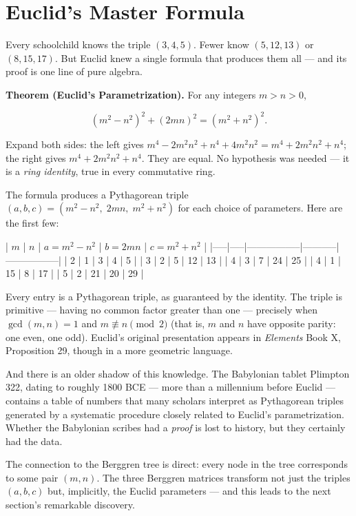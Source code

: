 \documentclass[11pt,twoside,openright]{book}
\theoremstyle{definition}
\theoremstyle{remark}
\begin{document}
\section{Euclid's Master Formula}

Every schoolchild knows the triple $(3, 4, 5)$. Fewer know $(5, 12, 13)$ or $(8, 15, 17)$. But Euclid knew a single formula that produces them all --- and its proof is one line of pure algebra.

\textbf{Theorem (Euclid's Parametrization).} For any integers $m > n > 0$,

\[(m^2 - n^2)^2 + (2mn)^2 = (m^2 + n^2)^2.\]

Expand both sides: the left gives $m^4 - 2m^2 n^2 + n^4 + 4m^2 n^2 = m^4 + 2m^2 n^2 + n^4$; the right gives $m^4 + 2m^2 n^2 + n^4$. They are equal. No hypothesis was needed --- it is a \textit{ring identity}, true in every commutative ring.

The formula produces a Pythagorean triple $(a, b, c) = (m^2 - n^2, \; 2mn, \; m^2 + n^2)$ for each choice of parameters. Here are the first few:

| $m$ | $n$ | $a = m^2 - n^2$ | $b = 2mn$ | $c = m^2 + n^2$ |
|-----|-----|-----------------|-----------|-----------------|
| 2   | 1   | 3               | 4         | 5               |
| 3   | 2   | 5               | 12        | 13              |
| 4   | 3   | 7               | 24        | 25              |
| 4   | 1   | 15              | 8         | 17              |
| 5   | 2   | 21              | 20        | 29              |

Every entry is a Pythagorean triple, as guaranteed by the identity. The triple is primitive --- having no common factor greater than one --- precisely when $\gcd(m, n) = 1$ and $m \not\equiv n \pmod{2}$ (that is, $m$ and $n$ have opposite parity: one even, one odd). Euclid's original presentation appears in \textit{Elements} Book X, Proposition 29, though in a more geometric language.

And there is an older shadow of this knowledge. The Babylonian tablet Plimpton 322, dating to roughly 1800 BCE --- more than a millennium before Euclid --- contains a table of numbers that many scholars interpret as Pythagorean triples generated by a systematic procedure closely related to Euclid's parametrization. Whether the Babylonian scribes had a \textit{proof} is lost to history, but they certainly had the data.


The connection to the Berggren tree is direct: every node in the tree corresponds to some pair $(m, n)$. The three Berggren matrices transform not just the triples $(a, b, c)$ but, implicitly, the Euclid parameters --- and this leads to the next section's remarkable discovery.
\end{document}
